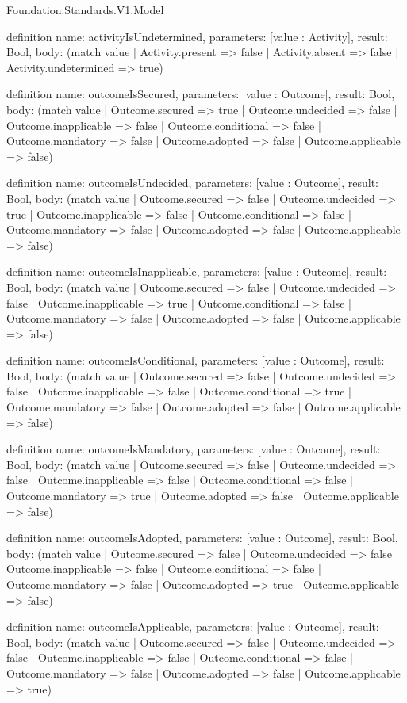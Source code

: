 \begin{lexlean}{Foundation.Standards.V1.Model}
\begin{semanticmodule}
definition{
  name: activityIsUndetermined,
  parameters: [value : Activity],
  result: Bool,
  body: (match value
    | Activity.present => false
    | Activity.absent => false
    | Activity.undetermined => true)
}

definition{
  name: outcomeIsSecured,
  parameters: [value : Outcome],
  result: Bool,
  body: (match value
    | Outcome.secured => true
    | Outcome.undecided => false
    | Outcome.inapplicable => false
    | Outcome.conditional => false
    | Outcome.mandatory => false
    | Outcome.adopted => false
    | Outcome.applicable => false)
}

definition{
  name: outcomeIsUndecided,
  parameters: [value : Outcome],
  result: Bool,
  body: (match value
    | Outcome.secured => false
    | Outcome.undecided => true
    | Outcome.inapplicable => false
    | Outcome.conditional => false
    | Outcome.mandatory => false
    | Outcome.adopted => false
    | Outcome.applicable => false)
}

definition{
  name: outcomeIsInapplicable,
  parameters: [value : Outcome],
  result: Bool,
  body: (match value
    | Outcome.secured => false
    | Outcome.undecided => false
    | Outcome.inapplicable => true
    | Outcome.conditional => false
    | Outcome.mandatory => false
    | Outcome.adopted => false
    | Outcome.applicable => false)
}

definition{
  name: outcomeIsConditional,
  parameters: [value : Outcome],
  result: Bool,
  body: (match value
    | Outcome.secured => false
    | Outcome.undecided => false
    | Outcome.inapplicable => false
    | Outcome.conditional => true
    | Outcome.mandatory => false
    | Outcome.adopted => false
    | Outcome.applicable => false)
}

definition{
  name: outcomeIsMandatory,
  parameters: [value : Outcome],
  result: Bool,
  body: (match value
    | Outcome.secured => false
    | Outcome.undecided => false
    | Outcome.inapplicable => false
    | Outcome.conditional => false
    | Outcome.mandatory => true
    | Outcome.adopted => false
    | Outcome.applicable => false)
}

definition{
  name: outcomeIsAdopted,
  parameters: [value : Outcome],
  result: Bool,
  body: (match value
    | Outcome.secured => false
    | Outcome.undecided => false
    | Outcome.inapplicable => false
    | Outcome.conditional => false
    | Outcome.mandatory => false
    | Outcome.adopted => true
    | Outcome.applicable => false)
}

definition{
  name: outcomeIsApplicable,
  parameters: [value : Outcome],
  result: Bool,
  body: (match value
    | Outcome.secured => false
    | Outcome.undecided => false
    | Outcome.inapplicable => false
    | Outcome.conditional => false
    | Outcome.mandatory => false
    | Outcome.adopted => false
    | Outcome.applicable => true)
}


\end{semanticmodule}
\end{lexlean}
